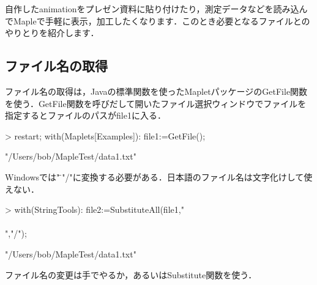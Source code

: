 自作したanimationをプレゼン資料に貼り付けたり，測定データなどを読み込んでMapleで手軽に表示，加工したくなります．このとき必要となるファイルとのやりとりを紹介します．

\subsection{ファイル名の取得}
ファイル名の取得は，Javaの標準関数を使ったMapletパッケージのGetFile関数を使う．GetFile関数を呼びだして開いたファイル選択ウィンドウでファイルを指定するとファイルのパスがfile1に入る．
\begin{MapleInput}
> restart; with(Maplets[Examples]): file1:=GetFile();
\end{MapleInput}
\begin{MapleError}
                       "/Users/bob/MapleTest/data1.txt"
\end{MapleError}
Windowsでは"\"を"/"に変換する必要がある．日本語のファイル名は文字化けして使えない．
\begin{MapleInput}
> with(StringTools): file2:=SubstituteAll(file1,"\\\\","/");
\end{MapleInput}
\begin{MapleError}
                       "/Users/bob/MapleTest/data1.txt"
\end{MapleError}
ファイル名の変更は手でやるか，あるいはSubstitute関数を使う．
